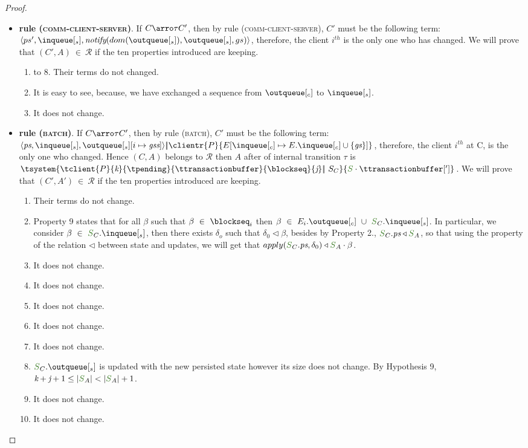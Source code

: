 \documentclass[envcountsect,runningheads,orivec]{llncs}
\begin{document}
\begin{proof}
\begin{itemize}
\begin{itemize}
					
				\item {\bf rule (\textsc{comm-client-server})}. If $C \arroi{\tau} C'$, then by rule (\textsc{\footnotesize{comm-client-server}}), $C'$ must be the following term: $\server{ps'}{\inserver}{\notify{dom(\outserver)}{\outserver}{gs}}$, therefore, the client $i^{th}$ is the only one who has changed. We will prove that $(C',A) \ \in \ \mathcal{R}$ if the ten properties introduced are keeping.				
					\begin{enumerate}
						\item to 8. Their terms do not changed.
						\setcounter{enumi}{8}	
						\item It is easy to see, because, we have exchanged a sequence from $\outclient$ to $\inserver$. 
						\item It does not change.
						\end{enumerate}
				


				
						\item {\bf rule (\textsc{batch})}. If $C \arroi{\tau} C'$, then by rule (\textsc{\footnotesize{batch}}), $C'$ must be the following term: $\server{\state}{\inserver}{\update{\outserver}{i}{\gss}} \bigpar 
		\clientr{P}{\update{E}{\inclient}{E.\inclient \cup \{\gs\}}}$, therefore, the client $i^{th}$ at C, is the only one who changed. Hence	$(C,A)$ belongs to $\mathcal{R}$ then $A$ after of internal transition $\tau$ is $\tsystem{\tclient{\tprogram}{\tknown}{\tpending}{\ttransactionbuffer}{\tsent}{\treceivebuffer}\bigpar\ S_C}{\queuemessage \cdot \tsenthead}$. We will prove that $(C',A') \ \in \ \mathcal{R}$ if the ten properties introduced are keeping.	
				\begin{enumerate}
						\item Their terms do not change.
						\item Property 9 states that for all $\beta$ such that $\beta \ \in \ \tsent_i$ then $\beta \ \in \ E_{i}.\outclient \ \cup \ \queuemessage_C.\inserver$. In particular, we consider $\beta \ \in \ \queuemessage_C.\inserver$, then there exists $\delta_o$ such that $\delta_0 \triangleleft \beta$, besides by Property 2., $\queuemessage_C.\state \triangleleft \queuemessage_A$, so that using the property of the relation $\triangleleft$ between state and updates, we will get that $apply(\queuemessage_C.\state,\delta_0) \triangleleft \queuemessage_A \cdot \beta$.
							\item It does not change.
							\item It does not change.
							\item It does not change.
							\item It does not change.
							\item It does not change.
							\item $\queuemessage_C.\outserver$ is updated with the new persisted state however its size does not change. By Hypothesis 9, $\tknown + \treceivebuffer + 1 \leq |\queuemessage_A| < |\queuemessage_A| + 1$.
							\item It does not change.
							\item It does not change.


\end{enumerate}
\end{itemize}
\end{itemize}
\end{proof}
\end{document}
